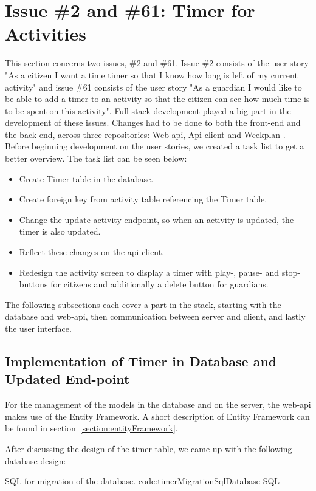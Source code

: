 \section{Issue \#2 and \#61: Timer for Activities}
This section concerns two issues, \#2 and \#61. Issue \#2 consists of the user story "As a citizen I want a time timer so that I know how long is left of my current activity" and issue \#61 consists of the user story "As a guardian I would like to be able to add a timer to an activity so that the citizen can see how much time is to be spent on this activity".
Full stack development played a big part in the development of these issues. Changes had to be done to both the front-end and the back-end, across three repositories: Web-api, Api-client and Weekplan .
Before beginning development on the user stories, we created a task list to get a better overview. The task list can be seen below:
\begin{itemize}
    \item Create Timer table in the database.
    \item Create foreign key from activity table referencing the Timer table.
    \item Change the update activity endpoint, so when an activity is updated, the timer is also updated.
    \item Reflect these changes on the api-client.
    \item Redesign the activity screen to display a timer with play-, pause- and stop-buttons for citizens and additionally a delete button for guardians. 
\end{itemize}

The following subsections each cover a part in the stack, starting with the database and web-api, then communication between server and client, and lastly the user interface.

\subsection{Implementation of Timer in Database and Updated End-point}
For the management of the models in the database and on the server, the web-api makes use of the Entity Framework. A short description of Entity Framework can be found in section~\ref{section:entityFramework}.

After discussing the design of the timer table, we came up with the following database design:

        {SQL for migration of the database.} %
        {code:timerMigrationSqlDatabase} %
        {SQL} %
        
